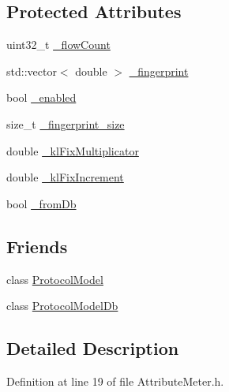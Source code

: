\subsection*{Protected Attributes}
\begin{DoxyCompactItemize}
\item 
uint32\-\_\-t \hyperlink{class_vsid_1_1_attribute_meter_aaa51ca831d84c6b76728ca9aa295fd98}{\-\_\-flow\-Count}
\item 
std\-::vector$<$ double $>$ \hyperlink{class_vsid_1_1_attribute_meter_a0386b2fe9c5d6ab6fba16029d8da4efe}{\-\_\-fingerprint}
\item 
bool \hyperlink{class_vsid_1_1_attribute_meter_a3eaf1e00fcc684082adabd65e5a4745e}{\-\_\-enabled}
\item 
size\-\_\-t \hyperlink{class_vsid_1_1_attribute_meter_a95396692ad5dd58a6e7460d8eaa9a9ec}{\-\_\-fingerprint\-\_\-size}
\item 
double \hyperlink{class_vsid_1_1_attribute_meter_a81d9c3a4e7d24af443803f980028c2db}{\-\_\-kl\-Fix\-Multiplicator}
\item 
double \hyperlink{class_vsid_1_1_attribute_meter_ac66c9e0062e1c4a1617dab984ed6c4a5}{\-\_\-kl\-Fix\-Increment}
\item 
bool \hyperlink{class_vsid_1_1_attribute_meter_a2ce3946fc699d3c375ee4019a9e3c022}{\-\_\-from\-Db}
\end{DoxyCompactItemize}
\subsection*{Friends}
\begin{DoxyCompactItemize}
\item 
class \hyperlink{class_vsid_1_1_attribute_meter_a80219b863d4ff3456933d16bc5f73f45}{Protocol\-Model}
\item 
class \hyperlink{class_vsid_1_1_attribute_meter_a3c0d389e7a9476b06313d8fb9ca9fe68}{Protocol\-Model\-Db}
\end{DoxyCompactItemize}


\subsection{Detailed Description}


Definition at line 19 of file Attribute\-Meter.\-h.



